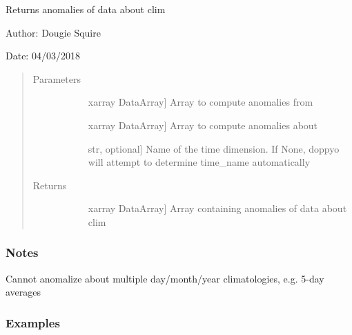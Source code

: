 \documentclass[letterpaper,10pt,english]{sphinxmanual}
\begin{document}

\begin{fulllineitems}
\label{\detokenize{utils_doc:utils.anomalize}}
Returns anomalies of data about clim

\begin{DUlineblock}{0em}
\item[] Author: Dougie Squire
\item[] Date: 04/03/2018
\end{DUlineblock}
\begin{quote}\begin{description}
\item[{Parameters}] \leavevmode\begin{description}
\item[{}] \leavevmode{[}xarray DataArray{]}
Array to compute anomalies from

\item[{}] \leavevmode{[}xarray DataArray{]}
Array to compute anomalies about

\item[{}] \leavevmode{[}str, optional{]}
Name of the time dimension. If None, doppyo will attempt to determine time\_name                     automatically

\end{description}

\item[{Returns}] \leavevmode\begin{description}
\item[{}] \leavevmode{[}xarray DataArray{]}
Array containing anomalies of data about clim

\end{description}

\end{description}\end{quote}
\subsubsection*{Notes}

Cannot anomalize about multiple day/month/year climatologies, e.g. 5-day averages
\subsubsection*{Examples}


\end{fulllineitems}
\end{document}
